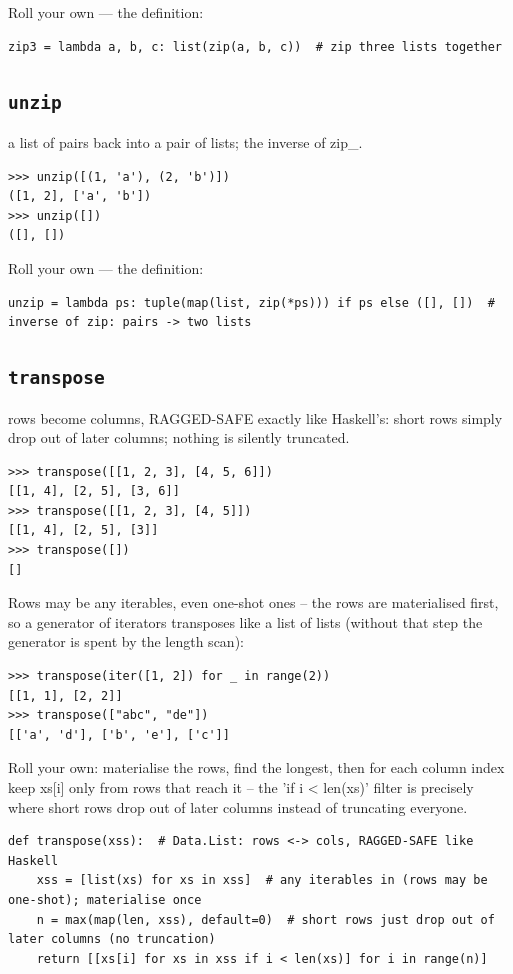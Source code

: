 \documentclass[10pt,letterpaper]{book}
\begin{document}
Roll your own --- the definition:

\begin{lstlisting}[style=ex]
zip3 = lambda a, b, c: list(zip(a, b, c))  # zip three lists together
\end{lstlisting}
\subsection{\texttt{unzip}}\label{def:unzip}
a list of pairs back into a pair of lists; the inverse of zip\_.
\begin{lstlisting}[style=ex]
>>> unzip([(1, 'a'), (2, 'b')])
([1, 2], ['a', 'b'])
>>> unzip([])
([], [])
\end{lstlisting}

Roll your own --- the definition:

\begin{lstlisting}[style=ex]
unzip = lambda ps: tuple(map(list, zip(*ps))) if ps else ([], [])  # inverse of zip: pairs -> two lists
\end{lstlisting}
\subsection{\texttt{transpose}}\label{def:transpose}
rows become columns, RAGGED-SAFE exactly like Haskell's: short rows simply drop out of later columns; nothing is silently truncated.
\begin{lstlisting}[style=ex]
>>> transpose([[1, 2, 3], [4, 5, 6]])
[[1, 4], [2, 5], [3, 6]]
>>> transpose([[1, 2, 3], [4, 5]])
[[1, 4], [2, 5], [3]]
>>> transpose([])
[]
\end{lstlisting}

Rows may be any iterables, even one-shot ones -- the rows are materialised first, so a generator of iterators transposes like a list of lists (without that step the generator is spent by the length scan):

\begin{lstlisting}[style=ex]
>>> transpose(iter([1, 2]) for _ in range(2))
[[1, 1], [2, 2]]
>>> transpose(["abc", "de"])
[['a', 'd'], ['b', 'e'], ['c']]
\end{lstlisting}

Roll your own: materialise the rows, find the longest, then for each column index keep xs[i] only from rows that reach it -- the 'if i < len(xs)' filter is precisely where short rows drop out of later columns instead of truncating everyone.

\begin{lstlisting}[style=ex]
def transpose(xss):  # Data.List: rows <-> cols, RAGGED-SAFE like Haskell
    xss = [list(xs) for xs in xss]  # any iterables in (rows may be one-shot); materialise once
    n = max(map(len, xss), default=0)  # short rows just drop out of later columns (no truncation)
    return [[xs[i] for xs in xss if i < len(xs)] for i in range(n)]
\end{lstlisting}
\end{document}
